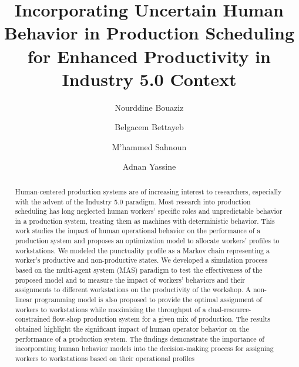 \documentclass[final,12pt, 3p, times]{elsarticle}
\begin{document}
\begin{frontmatter}


\title{Incorporating Uncertain Human Behavior in Production Scheduling for Enhanced Productivity in Industry 5.0 Context}

\author[inst1]{Nourddine Bouaziz}
\author[inst2]{Belgacem Bettayeb}
\author[inst1]{M'hammed Sahnoun}
\author[inst3]{Adnan Yassine}



\begin{abstract}
Human-centered production systems are of increasing interest to researchers, especially with the advent of the Industry 5.0 paradigm. Most research into production scheduling has long neglected human workers’ specific roles and unpredictable behavior in a production system, treating them as machines with deterministic behavior. This work studies the impact of human operational behavior on the performance of a production system and proposes an optimization model to allocate workers’ profiles to workstations. We modeled the punctuality profile as a Markov chain representing a worker’s productive and non-productive states. We developed a simulation process based on the multi-agent system (MAS) paradigm to test the effectiveness of the proposed model and to measure the impact of workers’ behaviors and their assignments to different workstations on the productivity of the workshop. A non-linear programming model is also proposed to provide the optimal assignment of workers to workstations while maximizing the throughput of a dual-resource-constrained flow-shop production system for a given mix of production. The results obtained highlight the significant impact of human operator behavior on the performance of a production system. The findings demonstrate the importance of incorporating human behavior models into the decision-making process for assigning workers to workstations based on their operational profiles
\end{abstract}
 
\end{frontmatter}
\end{document}
